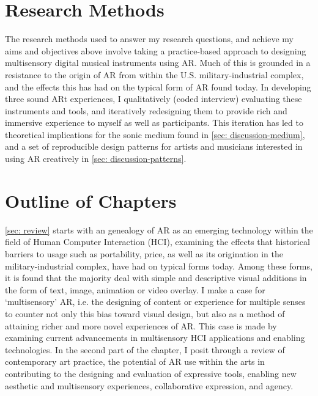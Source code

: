 \section{Research Methods}\label{sec: introduction-methods}
The research methods used to answer my research questions, and achieve my aims and objectives above involve taking a practice-based approach to designing multisensory digital musical instruments using AR. Much of this is grounded in a resistance to the origin of AR from within the U.S. military-industrial complex, and the effects this has had on the typical form of AR found today. In developing three sound ARt experiences, I  qualitatively (coded interview) evaluating these instruments and tools, and iteratively redesigning them to provide rich and immersive experience to myself as well as participants. This iteration has led to theoretical implications for the sonic medium found in \autoref{sec: discussion-medium}, and a set of reproducible design patterns for artists and musicians interested in using AR creatively in \autoref{sec: discussion-patterns}.




\section{Outline of Chapters}\label{sec: introduction-outline}
\autoref{sec: review} starts with an genealogy of AR as an emerging technology within the field of Human Computer Interaction (HCI), examining the effects that historical barriers to usage such as portability, price, as well as its origination in the military-industrial complex, have had on typical forms today. Among these forms, it is found that the majority deal with simple and descriptive visual additions in the form of text, image, animation or video overlay. I make a case for `multisensory' AR, i.e. the designing of content or experience for multiple senses to counter not only this bias toward visual design, but also as a method of attaining richer and more novel experiences of AR. This case is made by examining current advancements in multisensory HCI applications and enabling technologies. In the second part of the chapter, I posit through a review of contemporary art practice, the potential of AR use within the arts in contributing to the designing and evaluation of expressive tools, enabling new aesthetic and multisensory experiences, collaborative expression, and agency.

